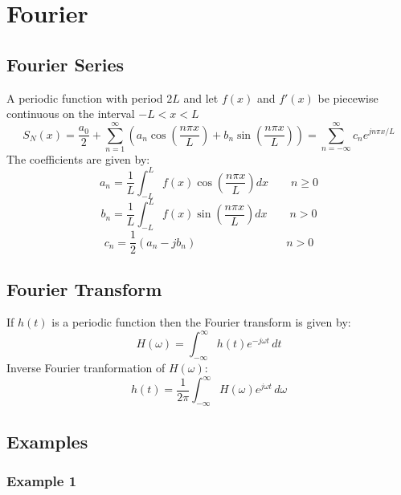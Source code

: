 \section{Fourier}
\subsection{Fourier Series}
A periodic function with period $2L$ and let $f(x)$ and $f'(x)$ be piecewise continuous on the interval $-L < x < L$
$$S_{N}(x)=\frac{a_{0}}{2}+\sum_{n=1}^{\infty}\left( a_{n}\cos\left( \frac{n\pi x}{L} \right)+b_{n}\sin\left( \frac{n\pi x}{L} \right) \right)=\sum^{\infty}_{n=-\infty}c_{n}e^{ jn\pi x/L }$$
The coefficients are given by:
$$a_n  =\frac{1}{L} \int_{-L}^L f(x) \cos \left(\frac{n \pi x}{L}\right) d x\qquad   n \geq 0$$
$$b_n  =\frac{1}{L} \int_{-L}^L f(x) \sin \left(\frac{n \pi x}{L}\right) d x\qquad   n>0$$
$$c_{n}=\frac{1}{2}(a_{n}-jb_{n})\qquad \qquad \qquad\qquad n>0$$

\subsection{Fourier Transform}
If $h(t)$ is a periodic function then the Fourier transform is given by:
$$H(\omega)=\int_{-\infty}^{\infty}h(t)e^{ -j\omega t }  \, dt $$
Inverse Fourier tranformation of $H(\omega)$:
$$h(t)=\frac{1}{2\pi}\int_{-\infty}^{\infty} H(\omega)e^{ j\omega t } \, d\omega $$

\subsection{Examples}
\subsubsection{Example 1}
